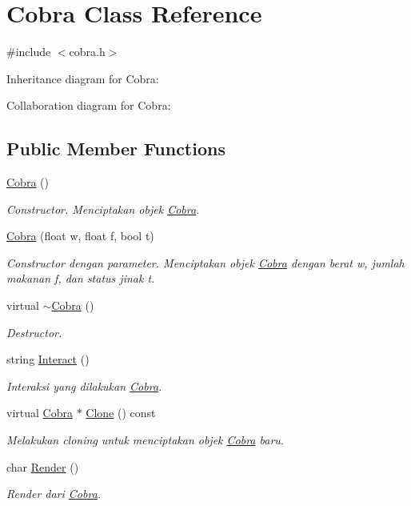 \hypertarget{classCobra}{}\section{Cobra Class Reference}
\label{classCobra}


{\ttfamily \#include $<$cobra.\+h$>$}



Inheritance diagram for Cobra\+:


Collaboration diagram for Cobra\+:
\subsection*{Public Member Functions}
\begin{DoxyCompactItemize}
\item 
\hyperlink{classCobra_acc0ec4a84ca7a0ea5e53aa1e8cabd268}{Cobra} ()
\begin{DoxyCompactList}\small\item\em Constructor. Menciptakan objek \hyperlink{classCobra}{Cobra}. \end{DoxyCompactList}\item 
\hyperlink{classCobra_ad1df7df30cea151706031ee0b9f28abd}{Cobra} (float w, float f, bool t)
\begin{DoxyCompactList}\small\item\em Constructor dengan parameter. Menciptakan objek \hyperlink{classCobra}{Cobra} dengan berat w, jumlah makanan f, dan status jinak t. \end{DoxyCompactList}\item 
virtual \hyperlink{classCobra_ac109599e6a8c9a01e852c54fb6fa2687}{$\sim$\+Cobra} ()
\begin{DoxyCompactList}\small\item\em Destructor. \end{DoxyCompactList}\item 
string \hyperlink{classCobra_aa8dd0878e3d654e51bec9592c88bcab5}{Interact} ()
\begin{DoxyCompactList}\small\item\em Interaksi yang dilakukan \hyperlink{classCobra}{Cobra}. \end{DoxyCompactList}\item 
virtual \hyperlink{classCobra}{Cobra} $\ast$ \hyperlink{classCobra_a1bfd2035a0a700b6362b1853cb12949b}{Clone} () const 
\begin{DoxyCompactList}\small\item\em Melakukan cloning untuk menciptakan objek \hyperlink{classCobra}{Cobra} baru. \end{DoxyCompactList}\item 
char \hyperlink{classCobra_abca7da2ee55ce825dc49f4f9a3e87208}{Render} ()
\begin{DoxyCompactList}\small\item\em Render dari \hyperlink{classCobra}{Cobra}. \end{DoxyCompactList}\end{DoxyCompactItemize}
